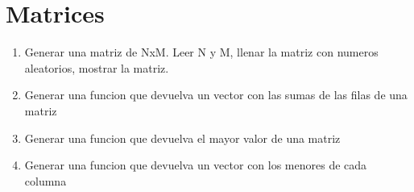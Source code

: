 \chapter{Matrices}

\begin{enumerate}[resume]

	\item Generar una matriz de NxM. Leer N y M, llenar la matriz con numeros aleatorios, mostrar la matriz.

	\item Generar una funcion que devuelva un vector con las sumas de las filas de una matriz
       
    \item Generar una funcion que devuelva el mayor valor de una matriz
       
    \item Generar una funcion que devuelva un vector con los menores de cada columna





\end{enumerate}


